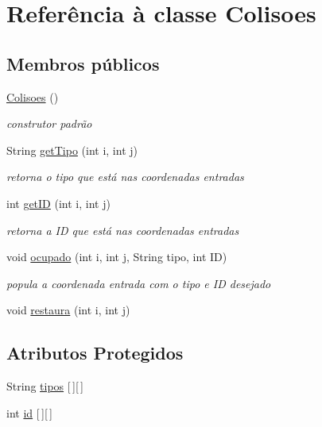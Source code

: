 \hypertarget{class_colisoes}{}\section{Referência à classe Colisoes}
\label{class_colisoes}
\subsection*{Membros públicos}
\begin{DoxyCompactItemize}
\item 
\mbox{\hyperlink{class_colisoes_a8a51b610e7e5d3a011b5c790429dc598}{Colisoes}} ()
\begin{DoxyCompactList}\small\item\em construtor padrão \end{DoxyCompactList}\item 
String \mbox{\hyperlink{class_colisoes_a12b4feebe3aceaf64b6a20941677d31f}{get\+Tipo}} (int i, int j)
\begin{DoxyCompactList}\small\item\em retorna o tipo que está nas coordenadas entradas \end{DoxyCompactList}\item 
int \mbox{\hyperlink{class_colisoes_a2a5dc91b1a181819919be8726272293a}{get\+ID}} (int i, int j)
\begin{DoxyCompactList}\small\item\em retorna a ID que está nas coordenadas entradas \end{DoxyCompactList}\item 
void \mbox{\hyperlink{class_colisoes_aee76e39346a03b3f6eeddbca2efe8067}{ocupado}} (int i, int j, String tipo, int ID)
\begin{DoxyCompactList}\small\item\em popula a coordenada entrada com o tipo e ID desejado \end{DoxyCompactList}\item 
void \mbox{\hyperlink{class_colisoes_ad901b8e1997c5166cf91e1571fc8a9b9}{restaura}} (int i, int j)
\end{DoxyCompactItemize}
\subsection*{Atributos Protegidos}
\begin{DoxyCompactItemize}
\item 
String \mbox{\hyperlink{class_colisoes_a44a61dfac2eac26a202bc861c07b3b04}{tipos}} \mbox{[}$\,$\mbox{]}\mbox{[}$\,$\mbox{]}
\item 
int \mbox{\hyperlink{class_colisoes_a24e82ed4cd735cdf7adc0e1dfe1da0d4}{id}} \mbox{[}$\,$\mbox{]}\mbox{[}$\,$\mbox{]}
\end{DoxyCompactItemize}


